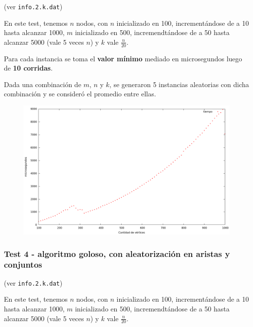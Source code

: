 (ver \verb|info.2.k.dat|) \medskip

En este test, tenemos $n$ nodos, con $n$ inicializado en 100, incrementándose de a 10 hasta alcanzar 1000, $m$ inicializado en 500, incremendtándose de a 50 hasta alcanzar 5000 (vale 5 veces $n$) y $k$ vale $\frac{n}{20}$.

Para cada instancia se toma el \textbf{valor mínimo} mediado en microsegundos luego de \textbf{10 corridas}.

Dada una combinación de $m$, $n$ y $k$, se generaron 5 instancias aleatorias con dicha combinación y se consideró el promedio entre ellas.

\vspace*{0.5cm}

\begin{figure}[h]
  \begin{center}
    \includegraphics[scale=0.35]{imagenes/grafico-greedy-c.png}
  \end{center}
\end{figure}

\vspace{0.5cm}


\newpage
\subsubsection{Test 4 - algoritmo goloso, con aleatorización en aristas y conjuntos}

(ver \verb|info.2.k.dat|) \medskip

En este test, tenemos $n$ nodos, con $n$ inicializado en 100, incrementándose de a 10 hasta alcanzar 1000, $m$ inicializado en 500, incremendtándose de a 50 hasta alcanzar 5000 (vale 5 veces $n$) y $k$ vale $\frac{n}{20}$.

